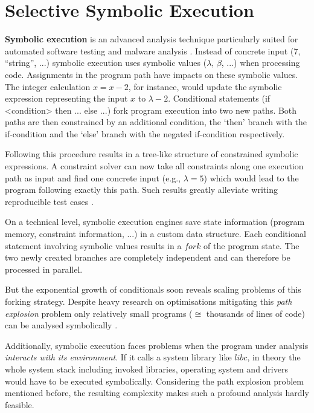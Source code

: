 \section{Selective Symbolic Execution}\label{sec:s2e}

\textbf{Symbolic execution} is an advanced analysis technique particularly suited for automated software testing  and malware analysis .
Instead of concrete input (7, ``string'', ...) symbolic execution uses symbolic values ($\lambda$, $\beta$, ...) when processing code.
Assignments in the program path have impacts on these symbolic values.
The integer calculation $x = x - 2$, for instance, would update the symbolic expression representing the input $x$ to $\lambda - 2$.
Conditional statements (if <condition> then ... else ...) fork program execution into two new paths.
Both paths are then constrained by an additional condition, the `then' branch with the if-condition and the `else' branch with the negated if-condition respectively.

Following this procedure results in a tree-like structure of constrained symbolic expressions.
A constraint solver can now take all constraints along one execution path as input and find one concrete input (e.g., $\lambda = 5$) which would lead to the program following exactly this path.
Such results greatly alleviate writing reproducible test cases \cite{chip09sel}.

On a technical level, symbolic execution engines save state information (program memory, constraint information, ...) in a custom data structure.
Each conditional statement involving symbolic values results in a $fork$ of the program state.
The two newly created branches are completely independent and can therefore be processed in parallel.

But the exponential growth of conditionals soon reveals scaling problems of this forking strategy.
Despite heavy research on optimisations mitigating this \textit{path explosion} problem  only relatively small programs ($\cong$ thousands of lines of code) can be analysed symbolically \cite{chip09sel}.

Additionally, symbolic execution faces problems when the program under analysis \textit{interacts with its environment}.
If it calls a system library like $libc$, in theory the whole system stack including invoked libraries, operating system and drivers would have to be executed symbolically.
Considering the path explosion problem mentioned before, the resulting complexity makes such a profound analysis hardly feasible.

